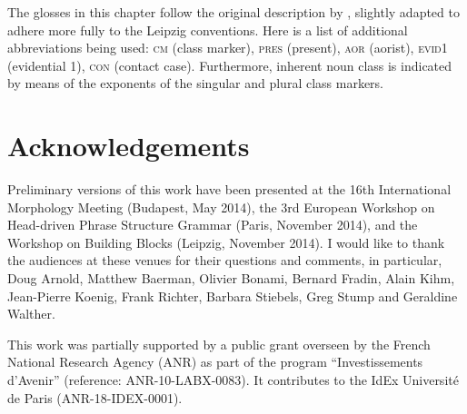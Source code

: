 \documentclass[output=paper]{langsci/langscibook}
\begin{document}
The glosses in this chapter follow the original description by
\citet{Harris09}, slightly adapted to adhere more fully to the Leipzig
conventions. Here is a list of additional abbreviations being used:
\textsc{cm} (class marker), \textsc{pres} (present), \textsc{aor}
(aorist), \textsc{evid1} (evidential 1), \textsc{con} (contact
case). Furthermore, inherent noun class is indicated by means of the
exponents of the singular and plural class markers.

\section*{Acknowledgements}

\begin{sloppypar}
  Preliminary versions of this work have been presented at the 16th
  International Morphology Meeting (Budapest, May 2014), the 3rd
  European Workshop on Head-driven Phrase Structure Grammar (Paris,
  November 2014), and the Workshop on Building Blocks (Leipzig,
  November 2014). I would like to thank the audiences at these venues
  for their questions and comments, in particular, Doug Arnold,
  Matthew Baerman, Olivier Bonami, Bernard Fradin, Alain Kihm,
  Jean-Pierre Koenig, Frank Richter, Barbara Stiebels, Greg Stump and
  Geraldine Walther.
\end{sloppypar}

This work was partially supported by a public grant overseen by the
French National Research Agency (ANR) as part of the program
``Investissements d’Avenir'' (reference: ANR-10-LABX-0083). It
contributes to the IdEx Université de Paris (ANR-18-IDEX-0001).

{\sloppy\printbibliography[heading=subbibliography,notkeyword=this]}
\end{document}
